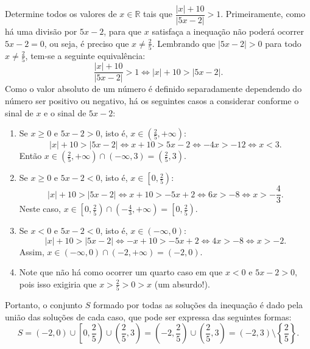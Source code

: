 \documentclass[12pt,a4paper]{article}
\newcommand*\R{\mathbb{R}}
\begin{document}
\begin{ExerciseList}
\Exercise[title={2,0}] Determine todos os valores de $x \in \R$ tais que $\dfrac{|x| + 10}{|5x-2|} > 1$.
\Answer Primeiramente, como há uma divisão por $5x-2$, para que $x$ satisfaça a inequação não poderá ocorrer $5x-2 = 0$, ou seja, é preciso que $x \neq \frac{2}{5}$. Lembrando que $|5x-2| > 0$ para todo $x \neq \frac{2}{5}$, tem-se a seguinte equivalência:
\[
\dfrac{|x| + 10}{|5x-2|} > 1
\Leftrightarrow
|x| + 10 > |5x-2|.
\]
Como o valor absoluto de um número é definido separadamente dependendo do número ser positivo ou negativo, há os seguintes casos a considerar conforme o sinal de $x$ e o sinal de $5x-2$:
\begin{enumerate}
\item Se $x \geq 0$ e $5x-2 > 0$, isto é, $x \in \left(\frac{2}{5}, +\infty\right)$:
\[
|x| + 10 > |5x-2|
\Leftrightarrow
x + 10 > 5x-2
\Leftrightarrow
-4x > -12
\Leftrightarrow
x < 3.
\]
Então $x \in \left(\frac{2}{5}, +\infty\right) \cap (-\infty,3) = \left(\frac{2}{5}, 3\right)$.

\item Se $x \geq 0$ e $5x-2 < 0$, isto é, $x \in \left[0, \frac{2}{5}\right)$:
\[
|x| + 10 > |5x-2|
\Leftrightarrow
x + 10 > -5x+2
\Leftrightarrow
6x > -8
\Leftrightarrow
x > -\frac{4}{3}.
\]
Neste caso, $x \in \left[0, \frac{2}{5}\right) \cap (-\frac{4}{3},+\infty) = \left[0, \frac{2}{5}\right)$.

\item Se $x < 0$ e $5x-2 < 0$, isto é, $x \in (-\infty, 0)$:
\[
|x| + 10 > |5x-2|
\Leftrightarrow
-x + 10 > -5x+2
\Leftrightarrow
4x > -8
\Leftrightarrow
x > -2.
\]
Assim, $x \in (-\infty, 0) \cap (-2,+\infty) = (-2, 0)$.
\item Note que não há como ocorrer um quarto caso em que $x < 0$ e $5x-2 > 0$, pois isso exigiria que $x > \frac{2}{5} > 0 > x$ (um absurdo!).
\end{enumerate}

Portanto, o conjunto $S$ formado por todas as soluções da inequação é dado pela união das soluções de cada caso, que pode ser expressa das seguintes formas:
\[
S = (-2, 0)
\cup \left[0, \frac{2}{5}\right)
\cup \left(\frac{2}{5}, 3\right)
= \left(-2, \frac{2}{5}\right)
\cup \left(\frac{2}{5}, 3\right)
= \left(-2, 3\right) \setminus \left\{ \frac{2}{5} \right\}.
\]


\end{ExerciseList}
\end{document}
